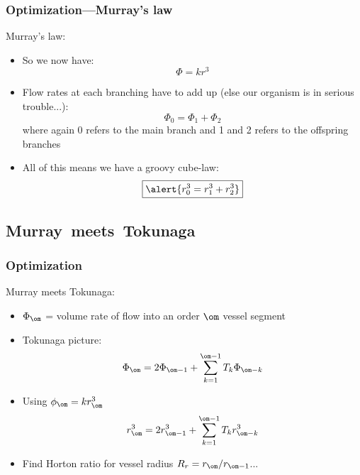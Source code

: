 \begin{frame}
  \frametitle{Optimization---Murray's law}

  \begin{block}{Murray's law:}
    \begin{itemize}
    \item<1-> So we now have:
      $$
      \Phi = k r^3 
      $$
    \item<2-> 
      Flow rates at each branching have to add up
      (else our organism is in serious trouble...):
      $$
      \Phi_0 = \Phi_1 + \Phi_2
      $$
      where again 0 refers to the  main branch and 1 and 2 refers
      to the offspring branches
    \item<3->
      All of this means we have a groovy cube-law:
      $$ 
      \boxed{\alert{r_0^3 = r_1^3 + r_2^3}}
      $$
      
    \end{itemize}
  \end{block}

\end{frame}

\subsection{Murray\ meets\ Tokunaga}


\begin{frame}
  \frametitle{Optimization}

  \begin{block}{Murray meets Tokunaga:}
    \begin{itemize}
    \item<1-> 
      $\Phi_\om$ = volume rate of flow into an order
      $\om$ vessel segment
    \item<2-> 
      Tokunaga picture:
      $$ 
      \Phi_\om
      = 
      2 \Phi_{\om - 1}
      +
      \sum_{k=1}^{\om-1}
      T_k
      \Phi_{\om-k}
      $$
    \item<3->
      Using $\phi_\om = k r_{\om}^{3}$
      $$
      r_\om^3
      = 
      2 r_{\om - 1}^{3}
      +
      \sum_{k=1}^{\om-1}
      T_k
      r_{\om-k}^{3}
      $$
    \item<4->
      Find Horton ratio for vessel radius $R_r = r_{\om}/r_{\om-1}$...
    \end{itemize}
  \end{block}

\end{frame}


